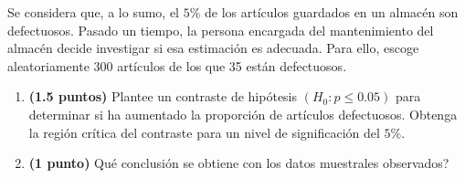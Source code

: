 
Se considera que, a lo sumo, el $5\%$ de los artículos guardados en un almacén son defectuosos. Pasado un tiempo, la persona encargada del mantenimiento del almacén decide investigar si esa estimación es adecuada. Para ello, escoge aleatoriamente 300 artículos de los que 35 están defectuosos.
\begin{enumerate}[label=\alph*)]
\item \textbf{(1.5 puntos)} Plantee un contraste de hipótesis $(H_0:p\leq0.05)$ para determinar si ha aumentado la proporción de artículos defectuosos. Obtenga la región crítica del contraste para un nivel de significación del $5\%$.
\item \textbf{(1 punto)} \textquestiondown{}Qué conclusión se obtiene con los datos muestrales observados?
\end{enumerate}
